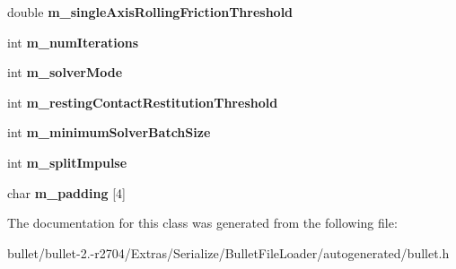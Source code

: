 \begin{DoxyCompactItemize}
\item 
\hypertarget{class_bullet_1_1bt_contact_solver_info_double_data_a03d673e11d5df8071da0755a794bc7d1}{double {\bfseries m\+\_\+single\+Axis\+Rolling\+Friction\+Threshold}}\label{class_bullet_1_1bt_contact_solver_info_double_data_a03d673e11d5df8071da0755a794bc7d1}

\item 
\hypertarget{class_bullet_1_1bt_contact_solver_info_double_data_a4acd63ae29e82a77f2c8a8cd3f384c83}{int {\bfseries m\+\_\+num\+Iterations}}\label{class_bullet_1_1bt_contact_solver_info_double_data_a4acd63ae29e82a77f2c8a8cd3f384c83}

\item 
\hypertarget{class_bullet_1_1bt_contact_solver_info_double_data_aa37049e9f07f487048e3631c0fd71d8f}{int {\bfseries m\+\_\+solver\+Mode}}\label{class_bullet_1_1bt_contact_solver_info_double_data_aa37049e9f07f487048e3631c0fd71d8f}

\item 
\hypertarget{class_bullet_1_1bt_contact_solver_info_double_data_a76a40e885b44e5039e39781ab6123df2}{int {\bfseries m\+\_\+resting\+Contact\+Restitution\+Threshold}}\label{class_bullet_1_1bt_contact_solver_info_double_data_a76a40e885b44e5039e39781ab6123df2}

\item 
\hypertarget{class_bullet_1_1bt_contact_solver_info_double_data_a68c51841d1e671ce3504362eb768a060}{int {\bfseries m\+\_\+minimum\+Solver\+Batch\+Size}}\label{class_bullet_1_1bt_contact_solver_info_double_data_a68c51841d1e671ce3504362eb768a060}

\item 
\hypertarget{class_bullet_1_1bt_contact_solver_info_double_data_a93791256dbad73a37c9e78a032546d67}{int {\bfseries m\+\_\+split\+Impulse}}\label{class_bullet_1_1bt_contact_solver_info_double_data_a93791256dbad73a37c9e78a032546d67}

\item 
\hypertarget{class_bullet_1_1bt_contact_solver_info_double_data_aec58d1ee56720ab1a9135445f74ad6cf}{char {\bfseries m\+\_\+padding} \mbox{[}4\mbox{]}}\label{class_bullet_1_1bt_contact_solver_info_double_data_aec58d1ee56720ab1a9135445f74ad6cf}

\end{DoxyCompactItemize}


The documentation for this class was generated from the following file\+:\begin{DoxyCompactItemize}
\item 
bullet/bullet-\/2.-\/r2704/\+Extras/\+Serialize/\+Bullet\+File\+Loader/autogenerated/bullet.\+h\end{DoxyCompactItemize}
